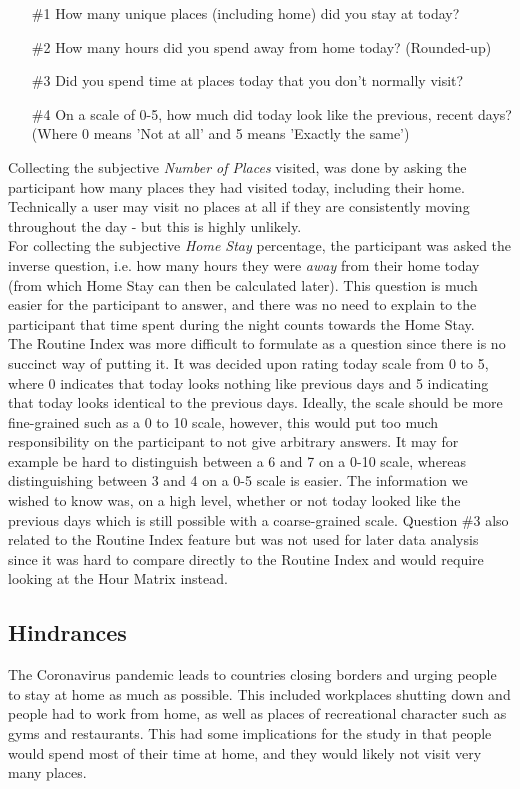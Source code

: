 \begin{itemize}
    \item[\#1] How many unique places (including home) did you stay at today?
    \item[\#2] How many hours did you spend away from home today? (Rounded-up)
    \item[\#3] Did you spend time at places today that you don't normally visit?
    \item[\#4] On a scale of 0-5, how much did today look like the previous, recent days? (Where 0 means 'Not at all' and 5 means 'Exactly the same')
\end{itemize}

Collecting the subjective \textit{Number of Places} visited, was done by asking the participant how many places they had visited today, including their home. Technically a user may visit no places at all if they are consistently moving throughout the day - but this is highly unlikely.\\

For collecting the subjective \textit{Home Stay} percentage, the participant was asked the inverse question, i.e. how many hours they were \textit{away} from their home today (from which Home Stay can then be calculated later). This question is much easier for the participant to answer, and there was no need to explain to the participant that time spent during the night counts towards the Home Stay. \\

The Routine Index was more difficult to formulate as a question since there is no succinct way of putting it. It was decided upon rating today scale from 0 to 5, where 0 indicates that today looks nothing like previous days and 5 indicating that today looks identical to the previous days. Ideally, the scale should be more fine-grained such as a 0 to 10 scale, however, this would put too much responsibility on the participant to not give arbitrary answers. It may for example be hard to distinguish between a 6 and 7 on a 0-10 scale, whereas distinguishing between 3 and 4 on a 0-5 scale is easier. The information we wished to know was, on a high level, whether or not today looked like the previous days which is still possible with a coarse-grained scale. Question \#3 also related to the Routine Index feature but was not used for later data analysis since it was hard to compare directly to the Routine Index and would require looking at the Hour Matrix instead.

\subsection{Hindrances}
The Coronavirus pandemic leads to countries closing borders and urging people to stay at home as much as possible. This included workplaces shutting down and people had to work from home, as well as places of recreational character such as gyms and restaurants. This had some implications for the study in that people would spend most of their time at home, and they would likely not visit very many places.\\

